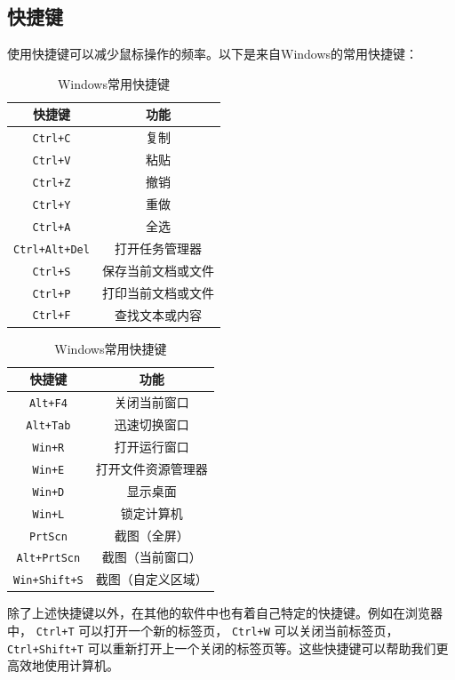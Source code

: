 \subsection{快捷键}

使用快捷键可以减少鼠标操作的频率。以下是来自Windows的常用快捷键：

\begin{table}[ht]
  \centering
  \caption{Windows常用快捷键}
  \label{tab:windows-shortcuts}
  \begin{tabular}[t]{c|c}
    \hline
    \textbf{快捷键} & \textbf{功能} \\
    \hline
     \texttt{Ctrl+C}  & 复制 \\
     \texttt{Ctrl+V}  & 粘贴 \\
     \texttt{Ctrl+Z}  & 撤销 \\
     \texttt{Ctrl+Y}  & 重做 \\
     \texttt{Ctrl+A}  & 全选 \\
     \texttt{Ctrl+Alt+Del}  & 打开任务管理器 \\
     \texttt{Ctrl+S}  & 保存当前文档或文件 \\
     \texttt{Ctrl+P}  & 打印当前文档或文件 \\
     \texttt{Ctrl+F}  & 查找文本或内容 \\
    \hline
  \end{tabular}
  \qquad
  \begin{tabular}[t]{c|c}
    \hline
    \textbf{快捷键} & \textbf{功能} \\
    \hline
     \texttt{Alt+F4}  & 关闭当前窗口 \\
     \texttt{Alt+Tab}  & 迅速切换窗口 \\
     \texttt{Win+R}  & 打开运行窗口 \\
     \texttt{Win+E}  & 打开文件资源管理器 \\
     \texttt{Win+D}  & 显示桌面 \\
     \texttt{Win+L}  & 锁定计算机 \\
     \texttt{PrtScn}  & 截图（全屏） \\
     \texttt{Alt+PrtScn}  & 截图（当前窗口） \\
     \texttt{Win+Shift+S}  & 截图（自定义区域） \\
    \hline
  \end{tabular}
\end{table}

除了上述快捷键以外，在其他的软件中也有着自己特定的快捷键。例如在浏览器中， \texttt{Ctrl+T} 可以打开一个新的标签页， \texttt{Ctrl+W} 可以关闭当前标签页， \texttt{Ctrl+Shift+T} 可以重新打开上一个关闭的标签页等。这些快捷键可以帮助我们更高效地使用计算机。



